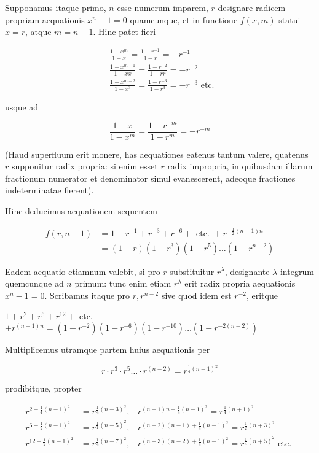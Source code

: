 \documentclass[10pt]{article}
\begin{document}
Supponamus itaque primo, \(n\) esse numerum imparem, \(r\) designare radicem propriam aequationis \(x^{n}-1=0\) quamcunque, et in functione \(f(x, m)\) statui \(x=r\), atque \(m=n-1\). Hinc patet fieri

\[
\begin{aligned}
& \frac{1-x^{m}}{1-x}=\frac{1-r^{-1}}{1-r}=-r^{-1} \\
& \frac{1-x^{m-1}}{1-x x}=\frac{1-r^{-2}}{1-r r}=-r^{-2} \\
& \frac{1-x^{m-2}}{1-x^{3}}=\frac{1-r^{-3}}{1-r^{3}}=-r^{-3} \text { etc. }
\end{aligned}
\]

usque ad

\[
\frac{1-x}{1-x^{m}}=\frac{1-r^{-m}}{1-r^{m}}=-r^{-m}
\]

(Haud superfluum erit monere, has aequationes eatenus tantum valere, quatenus \(r\) supponitur radix propria: si enim esset \(r\) radix impropria, in quibusdam illarum fractionum numerator et denominator simul evanescerent, adeoque fractiones indeterminatae fierent).

Hinc deducimus aequationem sequentem

\[
\begin{aligned}
f(r, n-1) & =1+r^{-1}+r^{-3}+r^{-6}+\text { etc. }+r^{-\frac{1}{2}(n-1) n} \\
& =(1-r)\left(1-r^{3}\right)\left(1-r^{5}\right) \ldots\left(1-r^{n-2}\right)
\end{aligned}
\]

Eadem aequatio etiamnum valebit, si pro \(r\) substituitur \(r^{\lambda}\), designante \(\lambda\) integrum quemcunque ad \(n\) primum: tunc enim etiam \(r^{\lambda}\) erit radix propria aequationis \(x^{n}-1=0\). Scribamus itaque pro \(r, r^{n-2}\) sive quod idem est \(r^{-2}\), eritque

\(1+r^{2}+r^{6}+r^{12}+\) etc. \(+r^{(n-1) n}=\left(1-r^{-2}\right)\left(1-r^{-6}\right)\left(1-r^{-10}\right) \ldots\left(1-r^{-2(n-2)}\right)\)

Multiplicemus utramque partem huius aequationis per

\[
r \cdot r^{3} \cdot r^{5} \ldots \cdot r^{(n-2)}=r^{\frac{1}{4}(n-1)^{2}}
\]

prodibitque, propter

\[
\begin{aligned}
r^{2+\frac{1}{4}(n-1)^{2}} & =r^{\frac{1}{4}(n-3)^{2}}, & r^{(n-1) n+\frac{1}{4}(n-1)^{2}}=r^{\frac{1}{4}(n+1)^{2}} \\
r^{6+\frac{1}{2}(n-1)^{2}} & =r^{\frac{1}{1}(n-5)^{2}}, & r^{(n-2)(n-1)+\frac{1}{4}(n-1)^{2}}=r^{\frac{1}{2}(n+3)^{2}} \\
r^{12+\frac{1}{2}(n-1)^{2}} & =r^{\frac{1}{4}(n-7)^{2}}, & r^{(n-3)(n-2)+\frac{1}{4}(n-1)^{2}}=r^{\frac{1}{4}(n+5)^{2}} \text { etc. }
\end{aligned}
\]
\end{document}
